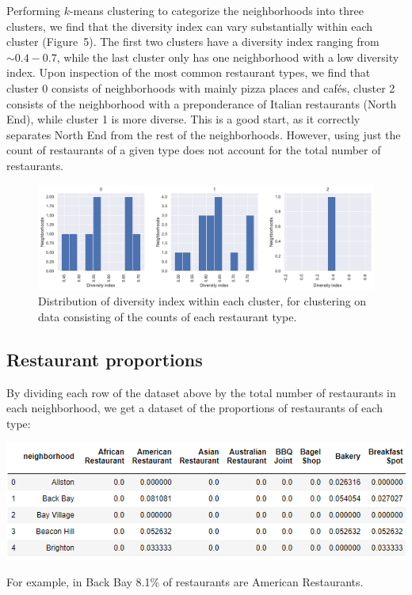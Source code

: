 \documentclass[11pt, a4paper]{article} %
\begin{document}
Performing $k$-means clustering to categorize the neighborhoods into three clusters, we find that the diversity index can vary substantially within each cluster (Figure~5).
The first two clusters have a diversity index ranging from $\sim0.4-0.7$, while the last cluster only has one neighborhood with a low diversity index.
Upon inspection of the most common restaurant types, we find that cluster 0 consists of neighborhoods with mainly pizza places and caf\'es, cluster 2 consists of the neighborhood with a preponderance of Italian restaurants (North End), while cluster 1 is more diverse.
This is a good start, as it correctly separates North End from the rest of the neighborhoods.
However, using just the count of restaurants of a given type does not account for the total number of restaurants.
\begin{figure}
\begin{center}
\includegraphics[width=\textwidth]{hist_counts.pdf}
\end{center}
\caption{Distribution of diversity index within each cluster, for clustering on data consisting of the counts of each restaurant type.}
\end{figure}



\subsection{Restaurant proportions}
By dividing each row of the dataset above by the total number of restaurants in each neighborhood, we get a dataset of the proportions of restaurants of each type:
\begin{center}
\includegraphics[]{df_prop.png}
\end{center}
For example, in Back Bay 8.1\% of restaurants are American Restaurants.
\end{document}
